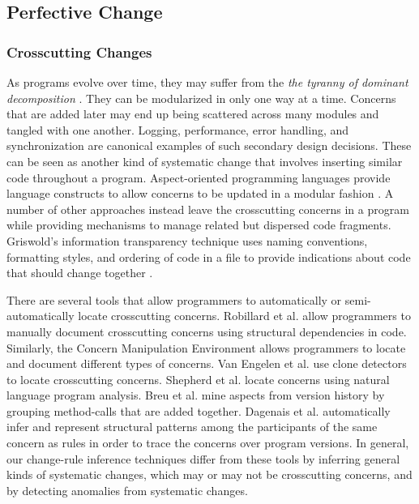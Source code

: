\documentclass[runningheads,a4paper]{llncs}
\begin{document}
\subsection{Perfective Change}
\label{sec:perfective}

\subsubsection{Crosscutting Changes} 

As programs evolve over time, they may suffer from the {\it the tyranny of dominant decomposition} \cite{Tarr1999}. They can be modularized in only one way at a time. Concerns that are added later may end up being scattered across many modules and tangled with one another.  Logging, performance, error handling, and synchronization are canonical examples of such secondary design decisions.  These can be seen as another kind of systematic change that involves inserting similar code throughout a program.  Aspect-oriented programming languages provide language constructs to allow concerns to be updated in a modular fashion \cite{Kiczales2001}. A number of other approaches instead leave the crosscutting concerns in a program while providing mechanisms to manage related but dispersed code fragments.  Griswold's information transparency technique uses naming conventions, formatting styles, and ordering of code in a file to provide indications about code that should change together \cite{Griswold2001}. 

There are several tools that allow programmers to automatically or semi-automatically locate crosscutting concerns. Robillard et al. \cite{Robillard2003} allow programmers to manually document crosscutting concerns using structural dependencies in code. Similarly, the Concern Manipulation Environment \cite{Harrison2005} allows programmers to locate and document different types of concerns. 
Van Engelen et al. \cite{VanEngelen2005} use clone detectors to locate crosscutting concerns. Shepherd et al. \cite{Shepherd2007} locate concerns using natural language program analysis.  Breu et al. \cite{Breu2006} mine aspects from version history by grouping method-calls that are added together. Dagenais et al. \cite{Dagenais2007} automatically infer and represent structural patterns among the participants of the same concern as rules in order to trace the concerns over program versions. In general, our change-rule inference techniques differ from these tools by inferring general kinds of systematic changes, which may or may not be crosscutting concerns, and by detecting anomalies from systematic changes. 
\end{document}
